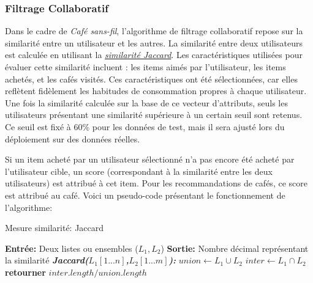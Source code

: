 \documentclass[11pt]{article}
\begin{document}
\subsubsection{Filtrage Collaboratif}
Dans le cadre de \textit{Café sans-fil}, l'algorithme de filtrage collaboratif repose sur la similarité entre un utilisateur et les autres. La similarité entre deux utilisateurs est calculée en utilisant la \hyperref[jaccard]{\textit{similarité Jaccard}}. Les caractéristiques utilisées pour évaluer cette similarité incluent : les items aimés par l'utilisateur, les items achetés, et les cafés visités. Ces caractéristiques ont été sélectionnées, car elles reflètent fidèlement les habitudes de consommation propres à chaque utilisateur. Une fois la similarité calculée sur la base de ce vecteur d'attributs, seuls les utilisateurs présentant une similarité supérieure à un certain seuil sont retenus. Ce seuil est fixé à 60\% pour les données de test, mais il sera ajusté lors du déploiement sur des données réelles.\

Si un item acheté par un utilisateur sélectionné n'a pas encore été acheté par l'utilisateur cible, un score (correspondant à la similarité entre les deux utilisateurs) est attribué à cet item. Pour les recommandations de cafés, ce score est attribué au café. Voici un pseudo-code présentant le fonctionnement de l'algorithme:

\begin{algorithm}[H]
    \caption{Mesure similarité: Jaccard}
    \begin{algorithmic}[1]
    \Statex \textbf{Entrée:} Deux listes ou ensembles ($L_1, L_2$)
    \Statex \textbf{Sortie:} Nombre décimal représentant la similarité
    \State \textbf{\textit{Jaccard($L_1[1...n]$,$L_2[1...m]$):}}
    \State \hspace{0.5cm} $union \leftarrow L_1 \cup L_2$
    \State \hspace{0.5cm} $inter \leftarrow L_1 \cap L_2$
    \State \hspace{0.5cm} \textbf{retourner} $inter.length/union.length$
    \end{algorithmic}
\end{algorithm}
\end{document}
